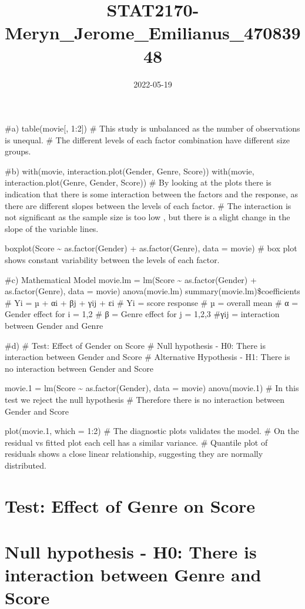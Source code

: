 \documentclass[
]{article}
\title{STAT2170-Meryn\_Jerome\_Emilianus\_47083948}
\author{}
\date{\vspace{-2.5em}2022-05-19}
\begin{document}
\maketitle

\#a) table(movie{[}, 1:2{]}) \# This study is unbalanced as the number
of observations is unequal. \# The different levels of each factor
combination have different size groups.

\#b) with(movie, interaction.plot(Gender, Genre, Score)) with(movie,
interaction.plot(Genre, Gender, Score)) \# By looking at the plots there
is indication that there is some interaction between the factors and the
response, as there are different slopes between the levels of each
factor. \# The interaction is not significant as the sample size is too
low , but there is a slight change in the slope of the variable lines.

boxplot(Score \textasciitilde{} as.factor(Gender) + as.factor(Genre),
data = movie) \# box plot shows constant variability between the levels
of each factor.

\#c) Mathematical Model movie.lm = lm(Score \textasciitilde{}
as.factor(Gender) + as.factor(Genre), data = movie) anova(movie.lm)
summary(movie.lm)\$coefficients \# Yi = µ + αi + βj + γij + εi \# Yi =
score response \# µ = overall mean \# α = Gender effect for i = 1,2 \# β
= Genre effect for j = 1,2,3 \#γij = interaction between Gender and
Genre

\#d) \# Test: Effect of Gender on Score \# Null hypothesis - H0: There
is interaction between Gender and Score \# Alternative Hypothesis - H1:
There is no interaction between Gender and Score

movie.1 = lm(Score \textasciitilde{} as.factor(Gender), data = movie)
anova(movie.1) \# In this test we reject the null hypothesis \#
Therefore there is no interaction between Gender and Score

plot(movie.1, which = 1:2) \# The diagnostic plots validates the model.
\# On the residual vs fitted plot each cell has a similar variance. \#
Quantile plot of residuals shows a close linear relationship, suggesting
they are normally distributed.

\hypertarget{test-effect-of-genre-on-score}{%
\section{Test: Effect of Genre on
Score}\label{test-effect-of-genre-on-score}}

\hypertarget{null-hypothesis---h0-there-is-interaction-between-genre-and-score}{%
\section{Null hypothesis - H0: There is interaction between Genre and
Score}\label{null-hypothesis---h0-there-is-interaction-between-genre-and-score}}
\end{document}
